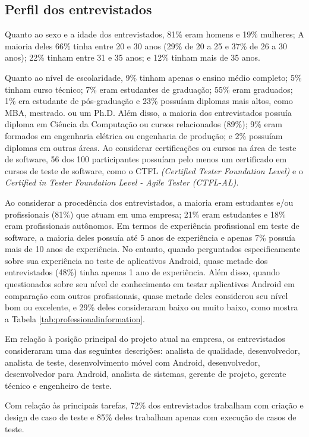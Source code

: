 \subsection{Perfil dos entrevistados}

Quanto ao sexo e a idade dos entrevistados, 81\% eram homens e 19\% mulheres; A maioria deles 66\% tinha entre 20 e 30 anos (29\% de 20 a 25 e 37\% de 26 a 30 anos); 22\% tinham entre 31 e 35 anos; e 12\% tinham mais de 35 anos. 

Quanto ao nível de escolaridade, 9\% tinham apenas o ensino médio completo; 5\% tinham curso técnico; 7\% eram estudantes de graduação; 55\% eram graduados; 1\% era estudante de pós-graduação e 23\% possuíam diplomas mais altos, como MBA, mestrado. ou um Ph.D. Além disso, a maioria dos entrevistados possuía diploma em Ciência da Computação ou cursos relacionados (89\%); 9\% eram formados em engenharia elétrica ou engenharia de produção; e 2\% possuíam diplomas em outras áreas. Ao considerar certificações ou cursos na área de teste de software, 56 dos 100 participantes possuíam pelo menos um certificado em cursos de teste de software, como o CTFL \textit{(Certified Tester Foundation Level)} e o \textit{Certified in Tester Foundation Level - Agile Tester (CTFL-AL)}.

Ao considerar a procedência dos entrevistados, a maioria eram estudantes e/ou profissionais (81\%) que atuam em uma empresa; 21\% eram estudantes e 18\% eram profissionais autônomos. Em termos de experiência profissional em teste de software, a maioria deles possuía até 5 anos de experiência e apenas 7\% possuía mais de 10 anos de experiência. No entanto, quando perguntados especificamente sobre sua experiência no teste de aplicativos Android, quase metade dos entrevistados (48\%) tinha apenas 1 ano de experiência. Além disso, quando questionados sobre seu nível de conhecimento em testar aplicativos Android em comparação com outros profissionais, quase metade deles considerou seu nível bom ou excelente, e 29\% deles consideraram baixo ou muito baixo, como mostra a Tabela \ref{tab:professionalinformation}.
 
Em relação à posição principal do projeto atual na empresa, os entrevistados consideraram uma das seguintes descrições: analista de qualidade, desenvolvedor, analista de teste, desenvolvimento móvel com Android, desenvolvedor, desenvolvedor para Android, analista de sistemas, gerente de projeto, gerente técnico e engenheiro de teste.
 
Com relação às principais tarefas, 72\% dos entrevistados trabalham com criação e design de caso de teste e 85\% deles trabalham apenas com execução de casos de teste.

